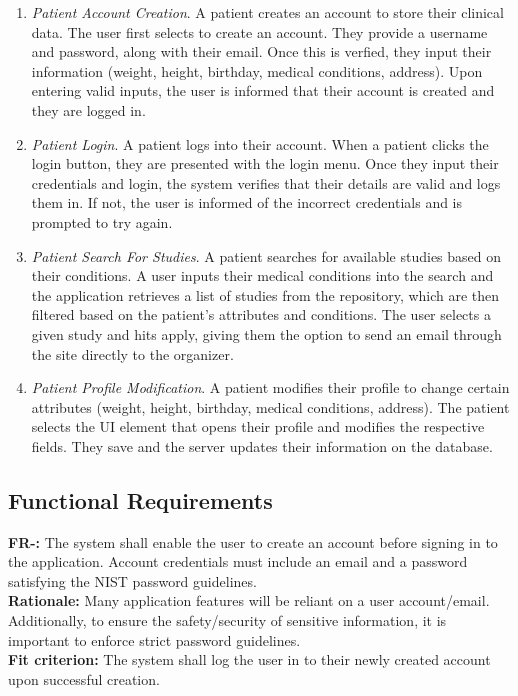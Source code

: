 \documentclass[12pt, titlepage]{article}
\newcounter{FR_Counter}
\begin{document}
\begin{enumerate}

\item \textit{Patient Account Creation}. A patient creates an account to store their clinical data. The user first selects to create an account. They provide a username and password, along with their email. Once this is verfied, they input their information (weight, height, birthday, medical conditions, address). Upon entering valid inputs, the user is informed that their account is created and they are logged in.

\item \textit{Patient Login}. A patient logs into their account. When a patient clicks the login button, they are presented with the login menu. Once they input their credentials and login, the system verifies that their details are valid and logs them in. If not, the user is informed of the incorrect credentials and is prompted to try again.

\item \textit{Patient Search For Studies}. A patient searches for available studies based on their conditions. A user inputs their medical conditions into the search and the application retrieves a list of studies from the repository, which are then filtered based on the patient's attributes and conditions. The user selects a given study and hits apply, giving them the option to send an email through the site directly to the organizer.

\item \textit{Patient Profile Modification}. A patient modifies their profile to change certain attributes (weight, height, birthday, medical conditions, address). The patient selects the UI element that opens their profile and modifies the respective fields. They save and the server updates their information on the database.

\end{enumerate}

\subsection{Functional Requirements}

\textbf{FR-\the\value{FR_Counter}:}
The system shall enable the user to create an account before signing in to the application. Account credentials must include 
an email and a password satisfying the NIST password guidelines.\\
\textbf{Rationale:}
Many application features will be reliant on a user account/email. Additionally, to ensure the safety/security of sensitive information,
it is important to enforce strict password guidelines. \\
\textbf{Fit criterion:}
The system shall log the user in to their newly created account upon successful creation. \\~\\
\addtocounter{FR_Counter}{1}
\end{document}
